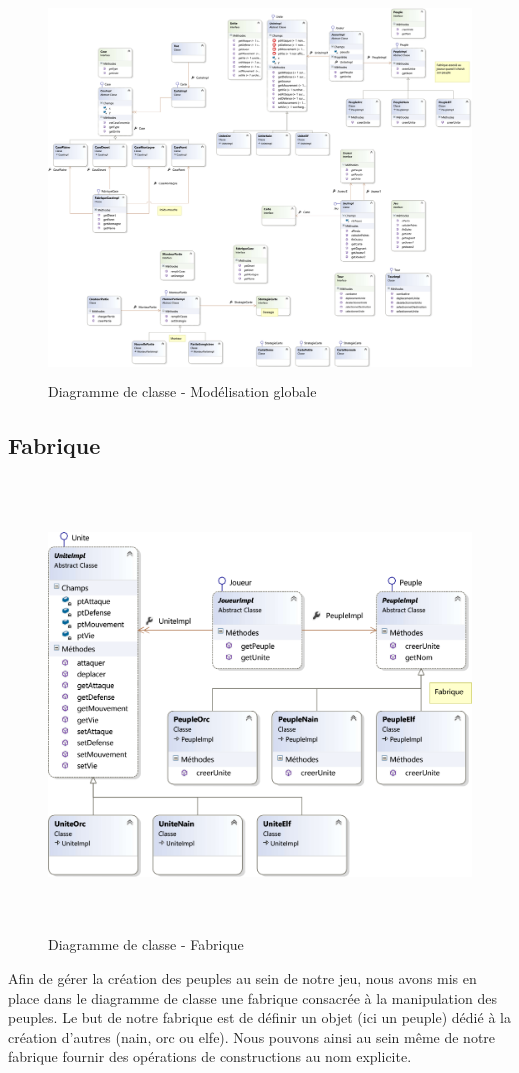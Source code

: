 \documentclass[a4paper,11pt]{article}
\begin{document}
	\vspace*{0.5cm}
	\begin{figure}[ht!]
		\includegraphics[height=10cm,width=15cm]{Diagrammes/Classe/classe.png}
		\caption{Diagramme de classe - Modélisation globale}
		\label{fig:classe}
	\end{figure}
	\newpage
\newpage
	\subsection{Fabrique}
		\begin{figure}[ht!]
			\includegraphics[height=12cm,width=14cm]{Diagrammes/Classe/fabrique.png}
			\caption{Diagramme de classe - Fabrique}
			\label{fig:fabrique}
		\end{figure}
		\vspace*{1cm}
		Afin de gérer la création des peuples au sein de notre jeu, nous avons mis en place dans le diagramme de classe une fabrique consacrée à la manipulation des peuples. Le but de notre fabrique est de définir un objet (ici un peuple) dédié à la création d’autres (nain, orc ou elfe). Nous pouvons ainsi au sein même de notre fabrique fournir des opérations de constructions au nom explicite.
		\newpage
\end{document}
